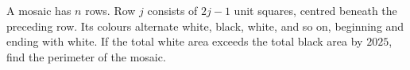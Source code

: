 A mosaic has $n$ rows. Row $j$ consists of $2j-1$ unit squares, centred beneath the preceding row. Its colours alternate white, black, white, and so on, beginning and ending with white. If the total white area exceeds the total black area by $2025$, find the perimeter of the mosaic.
